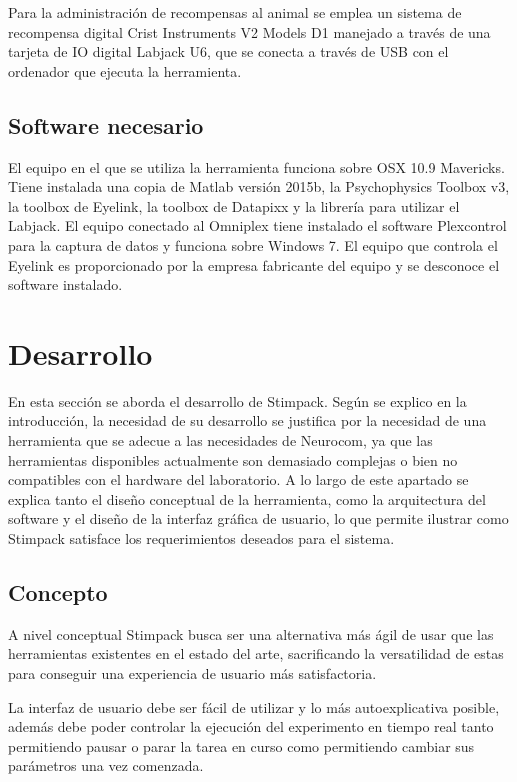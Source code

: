 \documentclass[conference]{IEEEtran}
\begin{document}
Para la administración de recompensas al animal se emplea un sistema de recompensa digital Crist Instruments V2 Models D1 manejado a través de una  tarjeta de IO digital Labjack U6\cite{labjack}, que se conecta a través de USB con el ordenador que ejecuta la herramienta.


\subsection{Software necesario}
El equipo en el que se utiliza la herramienta funciona sobre OSX 10.9 Mavericks. Tiene instalada una copia de Matlab versión 2015b, la Psychophysics Toolbox v3, la toolbox de Eyelink, la toolbox de Datapixx y la librería para utilizar el Labjack.
El equipo conectado al Omniplex tiene instalado el software Plexcontrol\cite{plexcontrol} para la captura de datos y funciona sobre Windows 7.
El equipo que controla el Eyelink es proporcionado por la empresa fabricante del equipo y se desconoce el software instalado.

\section{Desarrollo}


En esta sección se aborda el desarrollo de Stimpack. 
Según se explico en la introducción, la necesidad de su desarrollo se justifica por la necesidad de una herramienta que se adecue a las necesidades de Neurocom, ya que las herramientas disponibles actualmente son demasiado complejas o bien no compatibles con el hardware del laboratorio.
A lo largo de este apartado se explica tanto el diseño conceptual de la herramienta, como la arquitectura del software y el diseño de la interfaz gráfica de usuario, lo que permite ilustrar como Stimpack satisface los requerimientos deseados para el sistema.  


\subsection{Concepto}
 
 A nivel conceptual Stimpack busca ser una alternativa más ágil de usar que las herramientas existentes en el estado del arte, sacrificando la versatilidad de estas para conseguir una experiencia de usuario más satisfactoria.
 
 La interfaz de usuario debe ser fácil de utilizar y lo más autoexplicativa posible, además debe poder controlar la ejecución del experimento en tiempo real tanto permitiendo pausar o parar la tarea en curso como permitiendo cambiar sus parámetros una vez comenzada.
 
\end{document}
